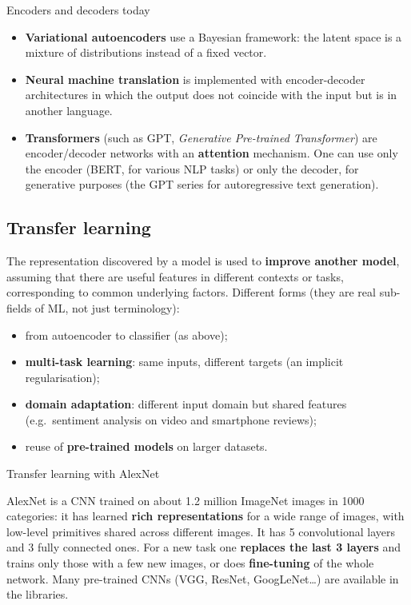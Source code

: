 \begin{boxnote}{Encoders and decoders today}

\begin{itemize}
\tightlist
\item
  \textbf{Variational autoencoders} use a Bayesian framework: the
  latent space is a mixture of distributions instead of a fixed
  vector.
\item
  \textbf{Neural machine translation} is implemented with
  encoder-decoder architectures in which the output does not coincide
  with the input but is in another language.
\item
  \textbf{Transformers} (such as GPT, \emph{Generative Pre-trained
  Transformer}) are encoder/decoder networks with an
  \textbf{attention} mechanism. One can use only the encoder (BERT, for
  various NLP tasks) or only the decoder, for generative purposes (the
  GPT series for autoregressive text generation).
\end{itemize}

\end{boxnote}

\subsection{Transfer learning}\label{transfer-learning}

The representation discovered by a model is used to \textbf{improve
another model}, assuming that there are useful features in different
contexts or tasks, corresponding to common underlying factors.
Different forms (they are real sub-fields of ML, not just
terminology):

\begin{itemize}
\tightlist
\item
  from autoencoder to classifier (as above);
\item
  \textbf{multi-task learning}: same inputs, different targets (an
  implicit regularisation);
\item
  \textbf{domain adaptation}: different input domain but shared
  features (e.g.\ sentiment analysis on video and smartphone reviews);
\item
  reuse of \textbf{pre-trained models} on larger datasets.
\end{itemize}

\begin{boxexample}{Transfer learning with AlexNet}

AlexNet is a CNN trained on about 1.2 million ImageNet images in 1000
categories: it has learned \textbf{rich representations} for a wide
range of images, with low-level primitives shared across different
images. It has 5 convolutional layers and 3 fully connected ones. For a
new task one \textbf{replaces the last 3 layers} and trains only those
with a few new images, or does \textbf{fine-tuning} of the whole
network. Many pre-trained CNNs (VGG, ResNet, GoogLeNet\ldots) are
available in the libraries.

\end{boxexample}

